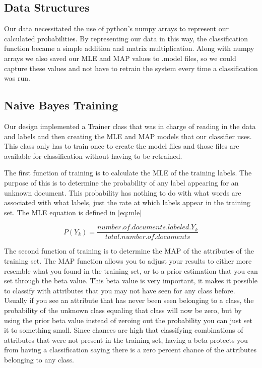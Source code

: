 \documentclass{IEEEtran}
\begin{document}
\subsection{Data Structures}
Our data necessitated the use of python’s numpy arrays to represent our calculated probabilities. By representing our data in this way, the classification function became a simple addition and matrix multiplication. Along with numpy arrays we also saved our MLE and MAP values to .model files, so we could capture these values and not have to retrain the system every time a classification was run.

\subsection{Naive Bayes Training}

Our design implemented a Trainer class that was in charge of reading in the data and labels and then creating the MLE and MAP models that our classifier uses. This class only has to train once to create the model files and those files are available for classification without having to be retrained. 

The first function of training is to calculate the MLE of the training labels. The purpose of this is to determine the probability of any label appearing for an unknown document. This probability has nothing to do with what words are associated with what labels, just the rate at which labels appear in the training set. The MLE equation is defined in \ref{eq:mle}

\begin{equation}
\label{eq:mle}
P(Y_k) = \dfrac{number.of.documents.labeled. Y_k}{total.number.of.documents}
\end{equation}

The second function of training is to determine the MAP of the attributes of the training set. The MAP function allows you to adjust your results to either more resemble what you found in the training set, or to a prior estimation that you can set through the beta value. This beta value is very important, it makes it possible to classify with attributes that you may not have seen for any class before. Usually if you see an attribute that has never been seen belonging to a class, the probability of the unknown class equaling that class will now be zero, but by using the prior beta value instead of zeroing out the probability you can just set it to something small. Since chances are high that classifying combinations of attributes that were not present in the training set, having a beta protects you from having a classification saying there is a zero percent chance of the attributes belonging to any class.
\end{document}
